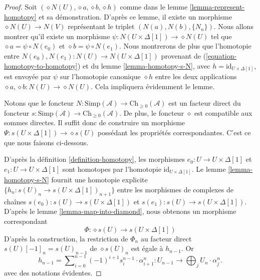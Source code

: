 \begin{proof}
Soit $(\diamond N(U), \diamond a, \diamond b, \diamond h)$ comme dans le
lemme \ref{lemma-represent-homotopy} et sa démonstration. D'après ce lemme,
il existe un morphisme $\diamond N(U) \to N(V)$ représentant le triplet
$(N(a), N(b), \{N_n\})$. Nous allons montrer qu'il existe un morphisme
$\psi : N(U \times \Delta[1]) \to \diamond{N(U)}$
tel que $\diamond a = \psi \circ N(e_0)$ et
$\diamond b = \psi \circ N(e_1)$. Nous montrerons de plus que l'homotopie entre
$N(e_0), N(e_1) :
N(U) \to N(U \times \Delta[1])$ provenant de
(\ref{equation-homotopy-to-homotopy}) et du
lemme \ref{lemma-homotopy-s-N}, avec
$h = \text{id}_{U \times \Delta[1]}$, est envoyée par
$\psi$ sur l'homotopie canonique $\diamond h$ entre les deux applications
$\diamond a, \diamond b : N(U) \to \diamond{N(U)}$.
Cela impliquera évidemment le lemme.

\medskip\noindent
Notons que le foncteur
$N : \text{Simp}(\mathcal{A}) \to \text{Ch}_{\geq 0}(\mathcal{A})$ est un
facteur direct du foncteur
$s : \text{Simp}(\mathcal{A}) \to \text{Ch}_{\geq 0}(\mathcal{A})$.
De plus, le foncteur $\diamond$ est compatible aux sommes directes.
Il suffit donc de construire un morphisme
$\Psi : s(U \times \Delta[1]) \to \diamond{s(U)}$ possédant les propriétés
correspondantes. C'est ce que nous faisons ci-dessous.

\medskip\noindent
D'après la définition \ref{definition-homotopy}, les morphismes
$e_0 : U \to U \times \Delta[1]$ et $e_1 : U \to U \times \Delta[1]$
sont homotopes par l'homotopie $\text{id}_{U \times \Delta[1]}$.
Le lemme \ref{lemma-homotopy-s-N} fournit une homotopie explicite
$\{h_n : s(U)_n \to s(U \times \Delta[1])_{n + 1}\}$
entre les morphismes de complexes de chaînes
$s(e_0) : s(U) \to s(U \times \Delta[1])$ et
$s(e_1) : s(U) \to s(U \times \Delta[1])$. D'après le
lemme \ref{lemma-map-into-diamond}, nous obtenons un morphisme correspondant
$$
\Phi : \diamond{s(U)} \to s(U \times \Delta[1])
$$
D'après la construction, la restriction de $\Phi_n$ au facteur direct
$s(U)[-1]_n = s(U)_{n - 1}$ de $\diamond{s(U)}_n$ est égale à
$h_{n - 1}$. Or
$$
h_{n - 1} = \sum\nolimits_{i = 0}^{n - 1}
(-1)^{i + 1} s^{n - 1}_i \cdot \alpha^n_{i + 1} :
U_{n - 1} \to \bigoplus\nolimits_j U_n \cdot \alpha^n_j.
$$
avec des notations évidentes.


\end{proof}

